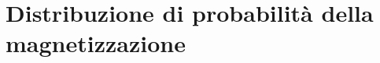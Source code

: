 \section{Distribuzione di probabilità della magnetizzazione}
\begin{center}
\begin{figure}[h]

\end{figure}
\end{center}
